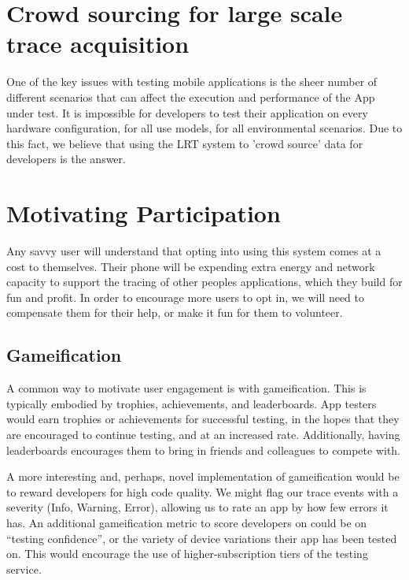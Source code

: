 \section{Crowd sourcing for large scale trace acquisition}
\label{section:crowdsourcing}
One of the key issues with testing mobile applications is the sheer number
of different scenarios that can affect the execution and performance
of the App under test. It is impossible for developers to test their application
on every hardware configuration, for all use models, for all environmental scenarios.
Due to this fact, we believe that using the LRT system to 'crowd source' data for developers
is the answer.

\section{Motivating Participation}
\label{section:motivatingparticipation}
Any savvy user will understand that opting into using this system comes at a cost to themselves.
Their phone will be expending extra energy and network capacity to support the tracing of 
other peoples applications, which they build for fun and profit.
In order to encourage more users to opt in, we will need to compensate them for their
help, or make it fun for them to volunteer.

\subsection{Gameification}
A common way to motivate user engagement is with gameification. This is typically embodied
by trophies, achievements, and leaderboards. App testers would earn trophies or achievements
for successful testing, in the hopes that they are encouraged to continue testing, and at an
increased rate. Additionally, having leaderboards encourages them to bring in friends and colleagues
to compete with.

A more interesting and, perhaps, novel implementation of gameification would be to reward developers
for high code quality. We might flag our trace events with a severity (Info, Warning, Error), allowing
us to rate an app by how few errors it has. An additional gameification metric to score developers on
could be on ``testing confidence'', or the variety of device variations their app has been tested on.
This would encourage the use of higher-subscription tiers of the testing service.

